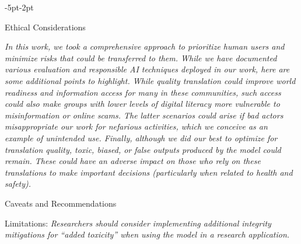 \begin{adjustwidth}{-5pt}{-2pt}
\begin{singlespace}
\begin{tcolorbox}[title=\textbf{\section{Model Card - \seamlessexpressive}\label{card:seamlessexpress}},
    breakable, sharp corners, boxrule=0.5pt]
\begin{mcsection}{Ethical Considerations}
 \item \textit{In this work, we took a comprehensive approach to prioritize human users and minimize risks that could be transferred to them. While we have documented various evaluation and responsible AI techniques deployed in our work, here are some additional points to highlight. 
 While quality translation could improve world readiness and information access for many in these communities, such access could also make groups with lower levels of digital literacy more vulnerable to misinformation or online scams. The latter scenarios could arise if bad actors misappropriate our work for nefarious activities, which we conceive as an example of unintended use. 
 Finally, although we did our best to optimize for translation quality, toxic, biased, or false outputs produced by the model could remain. These could have an adverse impact on those who rely on these translations to make important decisions (particularly when related to health and safety).} 
\end{mcsection}


\begin{mcsection}{Caveats and Recommendations}
  \item Limitations: \textit{Researchers should consider implementing additional integrity mitigations for ``added toxicity'' when using the model in a research application.}
\end{mcsection}


\end{tcolorbox}
\end{singlespace}
\end{adjustwidth}
